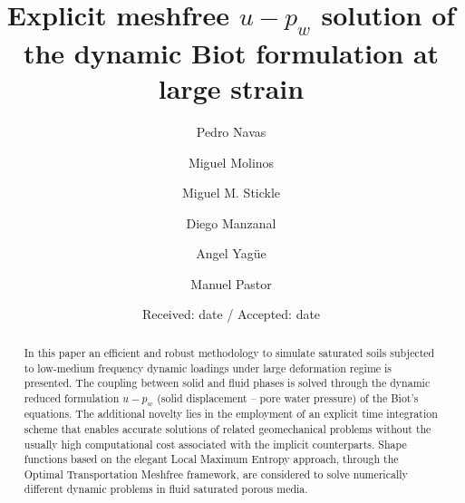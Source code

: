 \documentclass[twocolumn]{svjour3}          %
\begin{document}
\title{Explicit meshfree $u-p_w$ solution of the dynamic Biot formulation at large strain%
}


\author{Pedro Navas       \and
        Miguel Molinos \and
        Miguel M. Stickle \and
        Diego Manzanal \and
        Angel Yag\"ue \and
        Manuel Pastor
}



\date{Received: date / Accepted: date}


\maketitle

\begin{abstract}
In this paper an efficient and robust methodology to simulate saturated soils subjected to low-medium frequency dynamic loadings under large deformation regime is presented. The coupling between solid and fluid phases is solved through the dynamic reduced formulation $u-p_w$ (solid displacement -- pore water pressure) of the Biot's equations. The additional novelty lies in the employment of an explicit time integration scheme that enables accurate solutions of related  geomechanical problems without the usually high computational cost associated with the implicit counterparts. Shape functions based on the elegant Local Maximum Entropy approach, through the Optimal Transportation Meshfree framework, are considered to solve numerically different dynamic problems in fluid saturated porous media.
\end{abstract}
\end{document}
